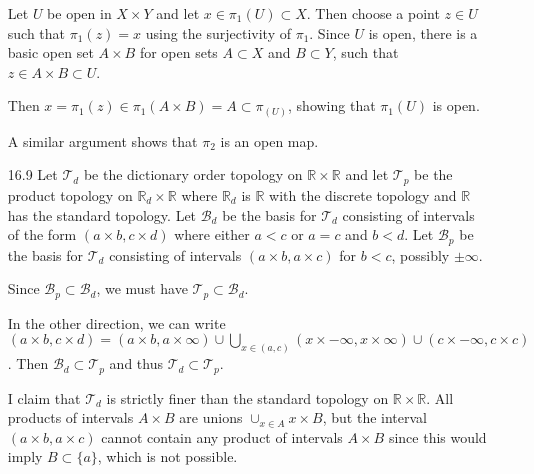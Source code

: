 \documentclass[11pt, reqno]{article}
\begin{document}
\begin{enumerate}
    Let $U$ be open in $X\times Y$ and let $x \in \pi_1(U)\subset X$. Then choose a point $z \in U$ such that 
    $\pi_1(z) = x$ using the surjectivity of $\pi_1$. Since $U$ is open, there is a basic open set 
    $A \times B$ for open sets $A \subset X$ and $B\subset Y$, such that $z \in A\times B \subset U$.

    Then $x = \pi_1(z) \in \pi_1(A\times B) = A \subset \pi_(U)$, showing that $\pi_1(U)$ is open.

    A similar argument shows that $\pi_2$ is an open map. 

    \item[16.9] Let $\mathcal{T}_d$ be the dictionary order topology on $\mathbb{R}\times\mathbb{R}$ and let $\mathcal{T}_p$ 
    be the product topology on $\mathbb{R}_d\times\mathbb{R}$ where $\mathbb{R}_d$ is $\mathbb{R}$ with the discrete
    topology and $\mathbb{R}$ has the standard topology. Let $\mathcal{B}_d$ be the basis for $\mathcal{T}_d$ consisting
    of intervals of the form $(a\times b, c\times d)$ where either $a < c$ or $a = c$ and $b < d$. 
    Let $\mathcal{B}_p$ be the basis for $\mathcal{T}_d$ consisting of intervals $(a\times b, a\times c)$ for $b < c$,
    possibly $\pm \infty$.
    
    Since $\mathcal{B}_p \subset \mathcal{B}_d$, we must have $\mathcal{T}_p \subset \mathcal{B}_d$.
    
    In the other direction, we can write $(a\times b, c\times d) = (a\times b, a\times \infty)
    \cup \bigcup_{x \in (a,c)} (x\times -\infty, x\times \infty) \cup (c\times -\infty, c\times c)$.
    Then $\mathcal{B}_d \subset \mathcal{T}_p$ and thus $\mathcal{T}_d \subset \mathcal{T}_p$.

    I claim that $\mathcal{T}_d$ is strictly finer than the standard topology on $\mathbb{R}\times\mathbb{R}$.
    All products of intervals $A\times B$ are unions $\cup_{x \in A} x\times B$, but the interval $(a\times b, a\times c)$ 
    cannot contain any product of intervals $A\times B$ since this would imply $B \subset \{a\}$, which is not possible.

\end{enumerate}
\end{document}

